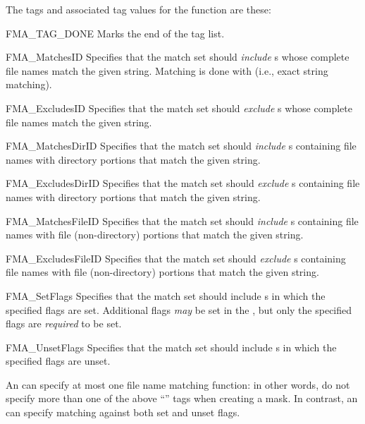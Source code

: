 \begin{cprototypelist}
  The tags and associated tag values for the 
  function are these:
  \begin{cidentifierlist}
    \item[FMA_TAG_DONE]
    \tagtypenull{} Marks the end of the tag list.

    \item[FMA_MatchesID]
     Specifies that the match set should \emph{include}
    s whose complete file names match the given string.
    Matching is done with  (i.e., exact string matching).

    \item[FMA_ExcludesID]
     Specifies that the match set should \emph{exclude}
    s whose complete file names match the given string.

    \item[FMA_MatchesDirID]
     Specifies that the match set should \emph{include}
    s containing file names with directory portions that match
    the given string.

    \item[FMA_ExcludesDirID]
     Specifies that the match set should \emph{exclude}
    s containing file names with directory portions that match
    the given string.

    \item[FMA_MatchesFileID]
     Specifies that the match set should \emph{include}
    s containing file names with file (non-directory) portions
    that match the given string.

    \item[FMA_ExcludesFileID]
     Specifies that the match set should \emph{exclude}
    s containing file names with file (non-directory) portions
    that match the given string.

    \item[FMA_SetFlags]
     Specifies that the match set should include
    s in which the specified flags are set.  Additional flags
    \emph{may} be set in the , but only the specified flags are
    \emph{required} to be set.

    \item[FMA_UnsetFlags]
     Specifies that the match set should include
    s in which the specified flags are unset.
  \end{cidentifierlist}
  An  can specify at most one file name matching function:
  in other words, do not specify more than one of the above
  ``'' tags when creating a mask.  In contrast, an
   can specify matching against both set and unset flags.


\end{cprototypelist}
